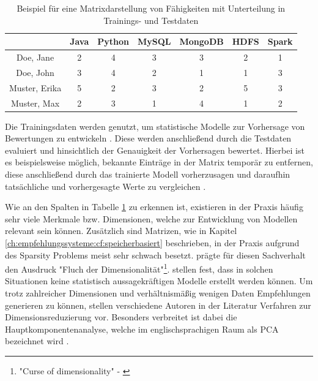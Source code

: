 \begin{table}[h]
	\centering
	\begin{tabular}{c|c|c|c|c|c|c}
		& Java & Python & MySQL & MongoDB & HDFS & Spark\\ 
		\hline
		Doe, Jane 		& \cellcolor{itemcolor}2 & \cellcolor{usercolor}4 & \cellcolor{itemcolor}3 & \cellcolor{usercolor}3 & \cellcolor{itemcolor}2 & \cellcolor{usercolor}1\\
		Doe, John 		& \cellcolor{usercolor}3 & \cellcolor{itemcolor}4 & \cellcolor{usercolor}2 & \cellcolor{itemcolor}1 & \cellcolor{usercolor}1 & \cellcolor{itemcolor}3\\
		Muster, Erika 	& \cellcolor{itemcolor}5 & \cellcolor{usercolor}2 & \cellcolor{itemcolor}3 & \cellcolor{usercolor}2 & \cellcolor{usercolor}5 & \cellcolor{usercolor}3\\
		Muster, Max 	& \cellcolor{usercolor}2 & \cellcolor{usercolor}3 & \cellcolor{usercolor}1 & \cellcolor{itemcolor}4 & \cellcolor{usercolor}1 & \cellcolor{itemcolor}2
	\end{tabular}
	\caption{Beispiel für eine Matrixdarstellung von Fähigkeiten mit Unterteilung in Trainings- und Testdaten}
	\label{tbl:empfehlungssysteme:cf:modellbasiert:tbl1}
\end{table}

Die Trainingsdaten werden genutzt, um statistische Modelle zur Vorhersage von Bewertungen zu entwickeln \cite[S. 71f.]{recommenderSystems:2016}.  Diese werden anschließend durch die Testdaten evaluiert und hinsichtlich der Genauigkeit der Vorhersagen bewertet. Hierbei ist es beispielsweise möglich, bekannte Einträge in der Matrix temporär zu entfernen, diese anschließend durch das trainierte Modell vorherzusagen und daraufhin tatsächliche und vorhergesagte Werte zu vergleichen \cite[S. 3ff.]{kang:2016}.

Wie an den Spalten in Tabelle \ref{tbl:empfehlungssysteme:cf:modellbasiert:tbl1} zu erkennen ist, existieren in der Praxis häufig sehr viele Merkmale bzw. Dimensionen, welche zur Entwicklung von Modellen relevant sein können. Zusätzlich sind Matrizen, wie in Kapitel \ref{ch:empfehlungssysteme:cf:speicherbasiert} beschrieben, in der Praxis aufgrund des Sparsity Problems meist sehr schwach besetzt. \textcite[S. 94]{bellman:1961} prägte für diesen Sachverhalt den Ausdruck "Fluch der Dimensionalität"\footnote{"Curse of dimensionality" - \textcite[S. 94]{bellman:1961}}. \textcite[S. 1]{boratto:2014} stellen fest, dass in solchen Situationen keine statistisch aussagekräftigen Modelle erstellt werden können. Um trotz zahlreicher Dimensionen und verhältnismäßig wenigen Daten Empfehlungen generieren zu können, stellen verschiedene Autoren in der Literatur Verfahren zur Dimensionsreduzierung vor. Besonders verbreitet ist dabei die Hauptkomponentenanalyse, welche im englischsprachigen Raum als \ac{PCA} bezeichnet wird \cite[S. 1ff.]{vaswani:2018}.

